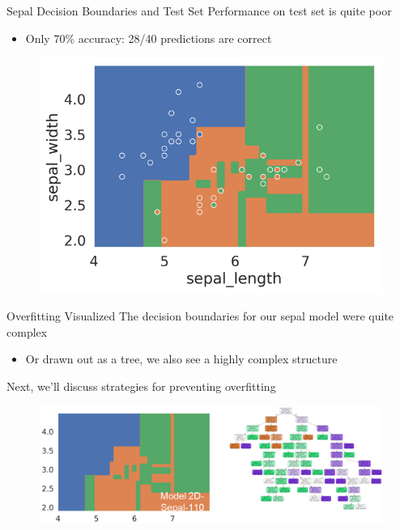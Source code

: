\documentclass[aspectratio=169]{../latex_main/tntbeamer}  %
\begin{document}
	
	
	\begin{frame}{Sepal Decision Boundaries and Test Set}
	    Performance on test set is quite poor
	    \begin{itemize}
	        \item Only 70\% accuracy: 28/40 predictions are correct
	    \end{itemize}
	    \begin{figure}
	        \centering
	        \includegraphics[scale=.65]{Bild38}
	    \end{figure}
	\end{frame}
	
	
	\begin{frame}{Overfitting Visualized}
	    The decision boundaries for our sepal model were quite complex
	    \begin{itemize}
	        \item Or drawn out as a tree, we also see a highly complex structure
	    \end{itemize}
	    Next, we’ll discuss strategies for preventing overfitting
	    \begin{figure}
	        \centering
	        \includegraphics[scale=.5]{Bild39}
	    \end{figure}
	\end{frame}
	
\end{document}
